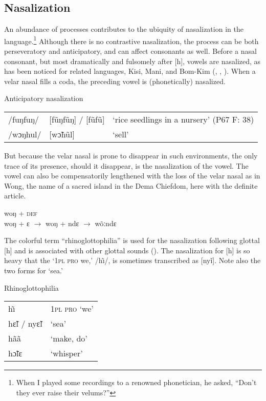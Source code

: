 \subsection{Nasalization}
\label{sec:2.4.2}
An abundance of processes contributes to the ubiquity of nasalization in the language.\footnote{When I played some recordings to a renowned phonetician, he asked, “Don't they ever raise their velums?”} Although there is no contrastive nasalization, the process can be both perseveratory and anticipatory, and can affect consonants as well. Before a nasal consonant, but most dramatically and fulsomely after [h], vowels are nasalized, as has been noticed for related languages, Kisi, Mani, and Bom-Kim (\citealt{Childs1995}, \citealt{Childs2011}, \citealt{Childs2020}). When a velar nasal fills a coda, the preceding vowel is (phonetically) nasalized.

\ea%
\label{ex:36}
Anticipatory nasalization\\
\begin{tabular}[t]{lll}
/fuŋfuŋ/ & [f\~uŋf\~uŋ] / [f\~uf\~u] & ‘rice seedlings in a nursery' (P67 F: 38)\\
/wɔŋhul/ & [wɔ̃hũl] & ‘sell'\\
\end{tabular}
\z

But because the velar nasal is prone to disappear in such environments, the only trace of its presence, should it disappear, is the nasalization of the vowel. The vowel can also be compensatorily lengthened with the loss of the velar nasal as in Wong, the name of a sacred island in the Dema Chiefdom, here with the definite article.

\ea%
\label{ex:37}
woŋ + \textsc{def}\\
woŋ + ɛ  $\xrightarrow{}$  woŋ + ndɛ  $\xrightarrow{}$  wõːndɛ\\
\z

The colorful term “rhinoglottophilia” is used for the nasalization following glottal [h] and is associated with other glottal sounds (\citealt{Matisoff1975}). The nasalization for [h] is so heavy that the ‘\textsc{1pl} \textsc{pro} we,' /h\~\i/, is sometimes transcribed as [nyĩ]. Note also the two forms for ‘sea.'

\ea%

\label{ex:38}
Rhinoglottophilia\\
\vspace{6pt}
\begin{tabular}[t]{ll}
h\~\i & \textsc{1pl} \textsc{pro} ‘we'\\
hɛ̃l / nyɛ̃l & ‘sea'\\
hãã & ‘make, do'\\
hɔ̃lɛ & ‘whisper'
\end{tabular}
\z

